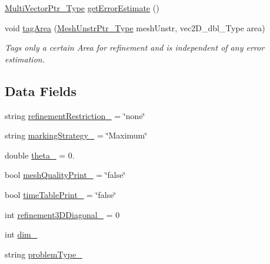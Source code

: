 \begin{DoxyCompactItemize}
\hyperlink{classFEDD_1_1ErrorEstimation_a5882ff373bf8c409b407b4fd1f42bda0}{Multi\+Vector\+Ptr\+\_\+\+Type} \hyperlink{classFEDD_1_1ErrorEstimation_a06bb52b16761823c1c506bdc5d501f50}{get\+Error\+Estimate} ()
\item 
void \hyperlink{classFEDD_1_1ErrorEstimation_a49f28452f08ee5a75220089b1d9c4b61}{tag\+Area} (\hyperlink{classFEDD_1_1ErrorEstimation_a862043dc355a1524640b5ef53e8eefa1}{Mesh\+Unstr\+Ptr\+\_\+\+Type} mesh\+Unstr, vec2\+D\+\_\+dbl\+\_\+\+Type area)
\begin{DoxyCompactList}\small\item\em Tags only a certain Area for refinement and is independent of any error estimation. \end{DoxyCompactList}\end{DoxyCompactItemize}
\subsection*{Data Fields}
\begin{DoxyCompactItemize}
\item 
string \hyperlink{classFEDD_1_1ErrorEstimation_ae187dd8db953862a2395d897e1317117}{refinement\+Restriction\+\_\+} = \char`\"{}none\char`\"{}
\item 
string \hyperlink{classFEDD_1_1ErrorEstimation_a235e923a33a175e7d884e1a2a6e0c7ec}{marking\+Strategy\+\_\+} = \char`\"{}Maximum\char`\"{}
\item 
double \hyperlink{classFEDD_1_1ErrorEstimation_a44fd0e48a1ed6edf6702058b7c43b170}{theta\+\_\+} = 0.
\item 
bool \hyperlink{classFEDD_1_1ErrorEstimation_a2db28f9a5cd90b6bb3abba15ed4ed7f0}{mesh\+Quality\+Print\+\_\+} = \char`\"{}false\char`\"{}
\item 
bool \hyperlink{classFEDD_1_1ErrorEstimation_aa1eaedab0d65507fec1b175f971bdecd}{time\+Table\+Print\+\_\+} = \char`\"{}false\char`\"{}
\item 
int \hyperlink{classFEDD_1_1ErrorEstimation_a3695b55e1703c3c03077bbc17a44fae9}{refinement3\+D\+Diagonal\+\_\+} = 0
\item 
int \hyperlink{classFEDD_1_1ErrorEstimation_adb166088e8d3021b4cc2e64b2966a26d}{dim\+\_\+}
\item 
string \hyperlink{classFEDD_1_1ErrorEstimation_abc2a8046fe8375f4a0c0ab0e52bc0ffc}{problem\+Type\+\_\+}
\end{DoxyCompactItemize}
